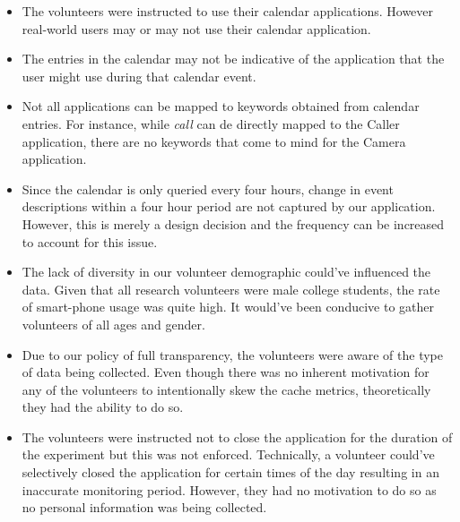 \documentclass[12pt]{uthesis-v12}  %
\begin{document}
			\begin{itemize}
				\item The volunteers were instructed to use their calendar applications. However real-world users may or may not use their calendar application.
				\item The entries in the calendar may not be indicative of the application that the user might use during that calendar event. 
				\item Not all applications can be mapped to keywords obtained from calendar entries. For instance, while {\em call} can de directly mapped to the Caller application, there are no keywords that come to mind for the Camera application.
				\item Since the calendar is only queried every four hours, change in event descriptions within a four hour period are not captured by our application. However, this is merely a design decision and the frequency can be increased to account for this issue. 
				\item The lack of diversity in our volunteer demographic could've influenced the data. Given that all research volunteers were male college students, the rate of smart-phone usage was quite high. It would've been conducive to gather volunteers of all ages and gender.
				\item Due to our policy of full transparency, the volunteers were aware of the type of data being collected. Even though there was no inherent motivation for any of the volunteers to intentionally skew the cache metrics, theoretically they had the ability to do so. 
				\item The volunteers were instructed not to close the application for the duration of the experiment but this was not enforced. Technically, a volunteer could've selectively closed the application for certain times of the day resulting in an inaccurate monitoring period. However, they had no motivation to do so as no personal information was being collected.
			\end{itemize}  		
\end{document}
